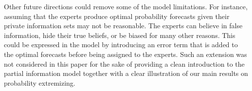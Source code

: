 \documentclass[11pt]{article}
\theoremstyle{definition}
\theoremstyle{definition}
\begin{document}
 
 Other future directions could  remove some of the model limitations. For instance, assuming that the experts produce optimal probability forecasts given their private information sets may not be reasonable. The experts can believe in false information, hide their true beliefs, or be biased for many other reasons. This could be expressed in the model by introducing an error term that is added to the optimal forecasts before being assigned to the experts. Such an extension was not considered in this paper for the sake of providing a clean introduction to the partial information model together with a clear illustration of our main results on  probability extremizing. 
 
 
% 

 
 
 


%

\end{document}
